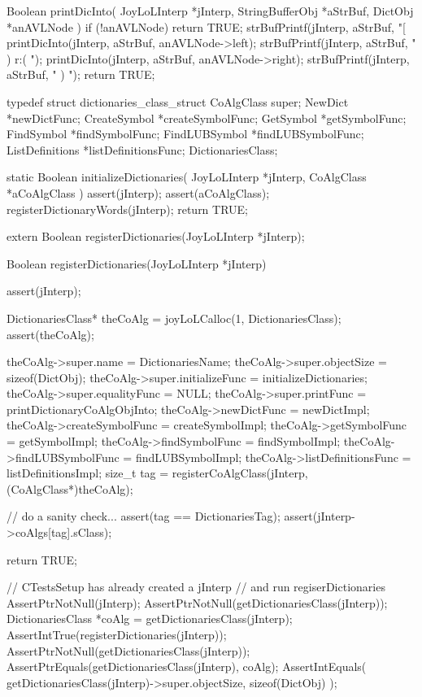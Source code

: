 Boolean printDicInto(
  JoyLoLInterp    *jInterp,
  StringBufferObj *aStrBuf,
  DictObj         *anAVLNode
) {
  if (!anAVLNode) return TRUE;
  strBufPrintf(jInterp, aStrBuf, "[%
  printDicInto(jInterp, aStrBuf, anAVLNode->left);
  strBufPrintf(jInterp, aStrBuf, " ) r:( ");
  printDicInto(jInterp, aStrBuf, anAVLNode->right);
  strBufPrintf(jInterp, aStrBuf, " ) ");
  return TRUE;
}
\stopCCode

\startTestSuite[registerDictionaries]

\startCHeader
typedef struct dictionaries_class_struct {
  CoAlgClass super;
  NewDict         *newDictFunc;
  CreateSymbol    *createSymbolFunc;
  GetSymbol       *getSymbolFunc;
  FindSymbol      *findSymbolFunc;
  FindLUBSymbol   *findLUBSymbolFunc;
  ListDefinitions *listDefinitionsFunc;
} DictionariesClass;
\stopCHeader

\startCCode
static Boolean initializeDictionaries(
  JoyLoLInterp *jInterp,
  CoAlgClass   *aCoAlgClass
) {
  assert(jInterp);
  assert(aCoAlgClass);
  registerDictionaryWords(jInterp);
  return TRUE;
}
\stopCCode

\startCHeader
extern Boolean registerDictionaries(JoyLoLInterp *jInterp);
\stopCHeader
{}

\startCCode
Boolean registerDictionaries(JoyLoLInterp *jInterp) {
  assert(jInterp);
  
  DictionariesClass* theCoAlg =
    joyLoLCalloc(1, DictionariesClass);
  assert(theCoAlg);
  
  theCoAlg->super.name            = DictionariesName;
  theCoAlg->super.objectSize      = sizeof(DictObj);
  theCoAlg->super.initializeFunc  = initializeDictionaries;
  theCoAlg->super.equalityFunc    = NULL;
  theCoAlg->super.printFunc       = printDictionaryCoAlgObjInto;
  theCoAlg->newDictFunc           = newDictImpl;
  theCoAlg->createSymbolFunc      = createSymbolImpl;
  theCoAlg->getSymbolFunc         = getSymbolImpl;
  theCoAlg->findSymbolFunc        = findSymbolImpl;
  theCoAlg->findLUBSymbolFunc     = findLUBSymbolImpl;
  theCoAlg->listDefinitionsFunc   = listDefinitionsImpl;
  size_t tag =
    registerCoAlgClass(jInterp, (CoAlgClass*)theCoAlg);
  
  // do a sanity check...
  assert(tag == DictionariesTag);
  assert(jInterp->coAlgs[tag].sClass);
    
  return TRUE;
}
\stopCCode


\startCTest
  // CTestsSetup has already created a jInterp
  // and run regiserDictionaries
  AssertPtrNotNull(jInterp);
  AssertPtrNotNull(getDictionariesClass(jInterp));
  DictionariesClass *coAlg =
    getDictionariesClass(jInterp);
  AssertIntTrue(registerDictionaries(jInterp));
  AssertPtrNotNull(getDictionariesClass(jInterp));
  AssertPtrEquals(getDictionariesClass(jInterp), coAlg);
  AssertIntEquals(
    getDictionariesClass(jInterp)->super.objectSize, 
    sizeof(DictObj)
  );
\stopCTest
\stopTestCase
\stopTestSuite

